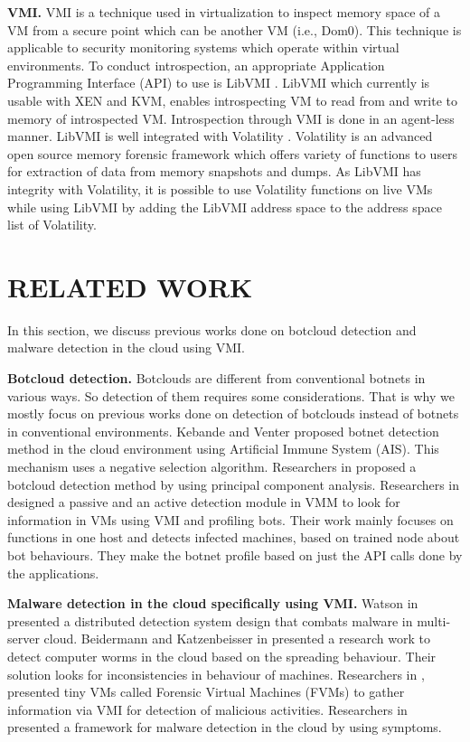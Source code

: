 \documentclass[conference]{IEEEtran}
\begin{document}
\textbf{VMI.}
VMI is a technique used in virtualization to inspect memory space of a VM from a secure point which can be another VM (i.e., Dom0). This technique is applicable to security monitoring systems which operate within virtual environments. To conduct introspection, an appropriate Application Programming Interface (API) to use is LibVMI \cite{ref11}. LibVMI which currently is usable with XEN and KVM, enables introspecting VM to read from and write to memory of introspected VM. Introspection through VMI is done in an agent-less manner. LibVMI is well integrated with Volatility \cite{ref19}. Volatility is an advanced open source memory forensic framework which offers variety of functions to users for extraction of data from memory snapshots and dumps. As LibVMI has integrity with Volatility, it is possible to use Volatility functions on live VMs while using LibVMI by adding the LibVMI address space to the address space list of Volatility.

\section{RELATED WORK}
In this section, we discuss previous works done on botcloud detection and malware detection in the cloud using VMI.
 
\textbf{Botcloud detection.}
Botclouds are different from conventional botnets in various ways. So detection of them requires some considerations. That is why we mostly focus on previous works done on detection of botclouds instead of botnets in conventional environments. Kebande and Venter \cite{ref3} proposed botnet detection method in the cloud environment using Artificial Immune System (AIS). This mechanism uses a negative selection algorithm. Researchers in \cite{ref41} proposed a botcloud detection method by using principal component analysis. Researchers in \cite{ref4} designed a passive and an active detection module in VMM to look for information in VMs using VMI and profiling bots. Their work mainly focuses on functions in one host and detects infected machines, based on trained node about bot behaviours. They make the botnet profile based on just the API calls done by the applications. 

\textbf{Malware detection in the cloud specifically using VMI.} 
Watson in \cite{ref13} presented a distributed detection system design that combats malware in multi-server cloud. Beidermann and Katzenbeisser in \cite{ref12} presented a research work to detect computer worms in the cloud based on the spreading behaviour. Their solution looks for inconsistencies in behaviour of machines. Researchers in \cite{ref7}, presented tiny VMs called Forensic Virtual Machines (FVMs) to gather information via VMI for detection of malicious activities. Researchers in \cite{ref6} presented a framework for malware detection in the cloud by using symptoms. 
\end{document}
